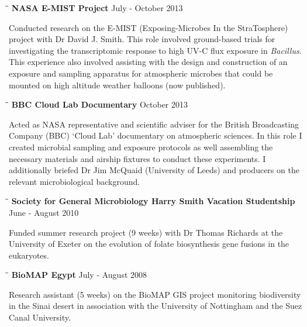 \documentclass{res}
\begin{document}
\begin{resume}
   \begin{tabbing}
   \hspace{2in}\= \hspace{2.6in}\= \kill 
    {\bf NASA E-MIST Project} \> \>     July - October 2013\\
     \end{tabbing}\vspace{-20pt}      
     Conducted research on the E-MIST (Exposing-Microbes In the StraTosphere) project with Dr David J. Smith. 
     This role involved ground-based trials for investigating the 
     transcriptomic response to high UV-C flux exposure in \textit{Bacillus}.  This experience also involved assisting with the design
     and construction of an exposure and sampling apparatus for atmospheric microbes that could be mounted on 
     high altitude weather balloons (now published).  
   \vspace{-0.1in}

   \begin{tabbing}
   \hspace{2in}\= \hspace{2.6in}\= \kill 
    {\bf BBC Cloud Lab Documentary} \> \>        October 2013\\
     \end{tabbing}\vspace{-20pt}      
     Acted as NASA representative and scientific adviser for the British Broadcasting Company (BBC) `Cloud Lab' documentary on atmospheric sciences. In this role I created microbial sampling and exposure protocols as well assembling the necessary materials and airship fixtures to conduct these experiments. I additionally briefed Dr Jim McQuaid (University of Leeds) and producers on the relevant microbiological background. 
   \vspace{-0.1in}
      \begin{tabbing}
   \hspace{2in}\= \hspace{2.6in}\= \kill 
    {\bf Society for General Microbiology Harry Smith Vacation Studentship} \> \>        June - August 2010\\
     \end{tabbing}\vspace{-20pt}      
     Funded summer research project (9 weeks) with Dr Thomas Richards at the University of Exeter on the evolution of folate biosynthesis gene fusions in the eukaryotes.

\vspace{-0.1in}
   \begin{tabbing}
   \hspace{2in}\= \hspace{2.6in}\= \kill 
    {\bf BioMAP Egypt} \> \>        July - August 2008\\
     \end{tabbing}\vspace{-20pt}      
     Research assistant (5 weeks) on the BioMAP GIS project monitoring biodiversity in the Sinai desert in association with the University of Nottingham and the Suez Canal University.


\end{resume}
\end{document}
